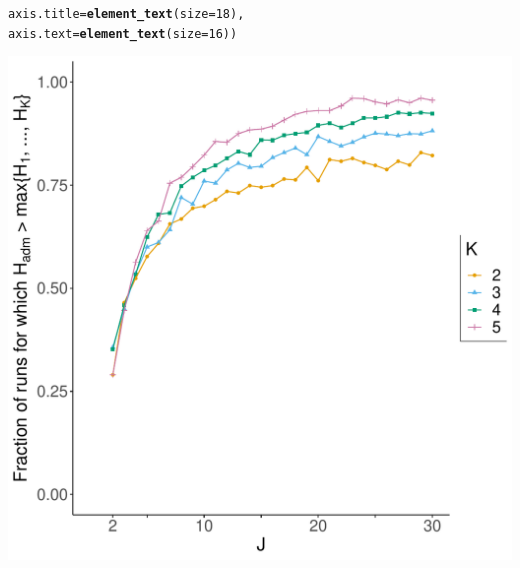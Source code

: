 \documentclass{article}\usepackage[]{graphicx}\usepackage[]{color}
\makeatletter
\def\maxwidth{ %
  \ifdim\Gin@nat@width>\linewidth
    \linewidth
  \else
    \Gin@nat@width
  \fi
}
\newcommand{\hlnum}[1]{\textcolor[rgb]{0.686,0.059,0.569}{#1}}%
\newcommand{\hlstd}[1]{\textcolor[rgb]{0.345,0.345,0.345}{#1}}%
\newcommand{\hlkwc}[1]{\textcolor[rgb]{0.333,0.667,0.333}{#1}}%
\newcommand{\hlkwd}[1]{\textcolor[rgb]{0.737,0.353,0.396}{\textbf{#1}}}%
\newenvironment{kframe}{%
 \def\at@end@of@kframe{}%
 \ifinner\ifhmode%
  \def\at@end@of@kframe{\end{minipage}}%
  \begin{minipage}{\columnwidth}%
 \fi\fi%
 \def\FrameCommand##1{\hskip\@totalleftmargin \hskip-\fboxsep
 \colorbox{shadecolor}{##1}\hskip-\fboxsep
     \hskip-\linewidth \hskip-\@totalleftmargin \hskip\columnwidth}%
 \MakeFramed {\advance\hsize-\width
   \@totalleftmargin\z@ \linewidth\hsize
   \@setminipage}}%
 {\par\unskip\endMakeFramed%
 \at@end@of@kframe}
\newenvironment{knitrout}{}{} %
\makeatother
\begin{document}
\begin{knitrout}
\begin{kframe}
\begin{alltt}
        \hlkwc{axis.title} \hlstd{=} \hlkwd{element_text}\hlstd{(}\hlkwc{size}\hlstd{=}\hlnum{18}\hlstd{),}
        \hlkwc{axis.text} \hlstd{=} \hlkwd{element_text}\hlstd{(}\hlkwc{size}\hlstd{=}\hlnum{16}\hlstd{))}
\end{alltt}
\end{kframe}
\includegraphics[width=\maxwidth]{../figs/Fig4-1} 

\end{knitrout}
\end{document}
